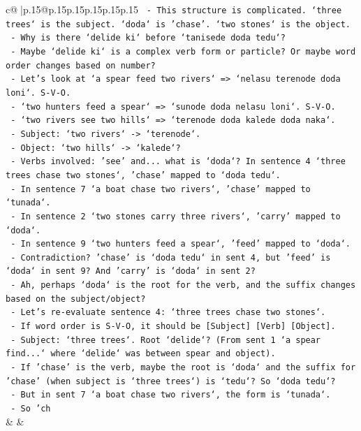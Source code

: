 \documentclass{article}
\begin{document}
{\begin{supertabular}{c@{$\;$}|p{.15\linewidth}@{}p{.15\linewidth}p{.15\linewidth}p{.15\linewidth}p{.15\linewidth}p{.15\linewidth}}
{{{\texttt{  {-} This structure is complicated. `three trees` is the subject. `doda` is 'chase'. `two stones` is the object.} \\
\texttt{  {-} Why is there `delide ki` before `tanisede doda tedu`?} \\
\texttt{  {-} Maybe `delide ki` is a complex verb form or particle? Or maybe word order changes based on number?} \\
\texttt{  {-} Let's look at `a spear feed two rivers` => `nelasu terenode doda loni`. S{-}V{-}O.} \\
\texttt{  {-} `two hunters feed a spear` => `sunode doda nelasu loni`. S{-}V{-}O.} \\
\texttt{  {-} `two rivers see two hills` => `terenode doda kalede doda naka`.} \\
\texttt{    {-} Subject: `two rivers` {-}> `terenode`.} \\
\texttt{    {-} Object: `two hills` {-}> `kalede`?} \\
\texttt{    {-} Verbs involved: 'see' and... what is `doda`? In sentence 4 `three trees chase two stones`, 'chase' mapped to `doda tedu`.} \\
\texttt{    {-} In sentence 7 `a boat chase two rivers`, 'chase' mapped to `tunada`.} \\
\texttt{    {-} In sentence 2 `two stones carry three rivers`, 'carry' mapped to `doda`.} \\
\texttt{    {-} In sentence 9 `two hunters feed a spear`, 'feed' mapped to `doda`.} \\
\texttt{    {-} Contradiction? 'chase' is `doda tedu` in sent 4, but 'feed' is `doda` in sent 9? And 'carry' is `doda` in sent 2?} \\
\texttt{    {-} Ah, perhaps `doda` is the root for the verb, and the suffix changes based on the subject/object?} \\
\texttt{    {-} Let's re{-}evaluate sentence 4: `three trees chase two stones`.} \\
\texttt{      {-} If word order is S{-}V{-}O, it should be {[}Subject{]} {[}Verb{]} {[}Object{]}.} \\
\texttt{      {-} Subject: `three trees`. Root `delide`? (From sent 1 `a spear find...` where `delide` was between spear and object).} \\
\texttt{      {-} If 'chase' is the verb, maybe the root is `doda` and the suffix for 'chase' (when subject is `three trees`) is `tedu`? So `doda tedu`?} \\
\texttt{      {-} But in sent 7 `a boat chase two rivers`, the form is `tunada`.} \\
\texttt{      {-} So 'ch} \\
            }
        }
    }
    & & \\ \\


\end{supertabular}}
\end{document}
